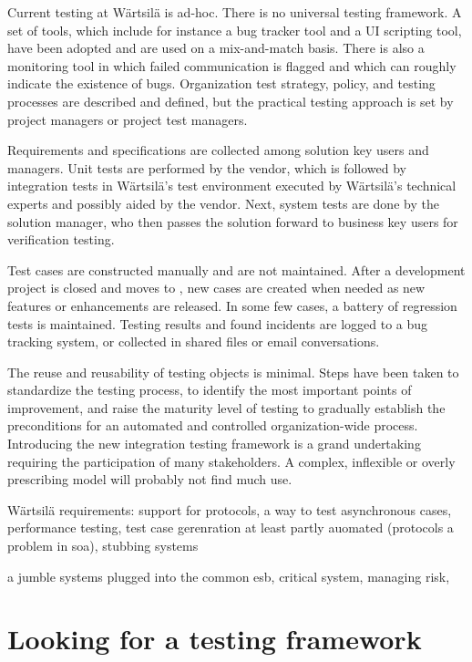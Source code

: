 \documentclass[12pt,a4paper,oneside,pdftex]{report}
\begin{document}
Current testing at Wärtsilä is ad-hoc. There is no universal testing framework. A set of tools, which include for instance a bug tracker tool and a UI scripting tool, have been adopted and are used on a mix-and-match basis. There is also a monitoring tool in which failed communication is flagged and which can roughly indicate the existence of bugs. Organization test strategy, policy, and testing processes are described and defined, but the practical testing approach is set by project managers or project test managers.

Requirements and specifications are collected among solution key users and managers. Unit tests are performed by the vendor, which is followed by integration tests in Wärtsilä's test environment executed by Wärtsilä's technical experts and possibly aided by the vendor. Next, system tests are done by the solution manager, who then passes the solution forward to business key users for verification testing. %

Test cases are constructed manually and are not maintained. After a development project is closed and moves to , new cases are created when needed as new features or enhancements are released. In some few cases, a battery of regression tests is maintained. Testing results and found incidents are logged to a bug tracking system, or collected in shared files or email conversations. 

The reuse and reusability of testing objects is minimal. Steps have been taken to standardize the testing process, to identify the most important points of improvement, and raise the maturity level of testing to gradually establish the preconditions for an automated and controlled organization-wide process. Introducing the new integration testing framework is a grand undertaking requiring the participation of many stakeholders. A complex, inflexible or overly prescribing model will probably not find much use.

Wärtsilä requirements: support for protocols, a way to test asynchronous cases, performance testing, test case gerenration at least partly auomated (protocols a problem in soa), stubbing systems

a jumble systems plugged into the common esb, critical system, managing risk, 

\chapter{Looking for a testing framework}
\label{chapter:frameworktheory}
\end{document}
